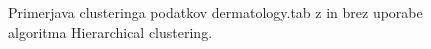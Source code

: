 \documentclass[a4paper]{article}
\begin{document}
	\begin{figure}[H]
	\begin{center}
	\end{center}
	\caption{Primerjava clusteringa podatkov dermatology.tab z in brez uporabe algoritma Hierarchical clustering.}
	\label{clus_der}
	\end{figure}
\end{document}
